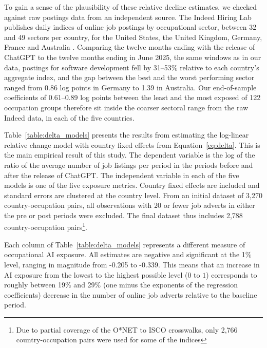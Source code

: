 \documentclass[11pt]{article}
\begin{document}
To gain a sense of the plausibility of these relative decline estimates, we checked against raw postings data from an independent source. The Indeed Hiring Lab publishes daily indices of online job postings by occupational sector, between 32 and 49 sectors per country, for the United States, the United Kingdom, Germany, France and Australia \citep{indeed_hiring_lab}. Comparing the twelve months ending with the release of ChatGPT to the twelve months ending in June 2025, the same windows as in our data, postings for software development fell by 31--53\% relative to each country's aggregate index, and the gap between the best and the worst performing sector ranged from 0.86 log points in Germany to 1.39 in Australia. Our end-of-sample coefficients of 0.61--0.89 log points between the least and the most exposed of 122 occupation groups therefore sit inside the coarser sectoral range from the raw Indeed data, in each of the five countries.

Table~\ref{table:delta_models} presents the results from estimating the log-linear relative change model with country fixed effects from Equation~\ref{eq:delta}. This is the main empirical result of this study. The dependent variable is the log of the ratio of the average number of job listings per period in the periods before and after the release of ChatGPT. The independent variable in each of the five models is one of the five exposure metrics. Country fixed effects are included and standard errors are clustered at the country level. From an initial dataset of 3,270 country-occupation pairs, all observations with 20 or fewer job adverts in either the pre or post periods were excluded. The final dataset thus includes 2,788 country-occupation pairs\footnote{Due to partial coverage of the O*NET to ISCO crosswalks, only 2,766 country-occupation pairs were used for some of the indices}.

Each column of Table~\ref{table:delta_models} represents a different measure of occupational AI exposure. All estimates are negative and significant at the 1\% level, ranging in magnitude from -0.205 to -0.339. This means that an increase in AI exposure from the lowest to the highest possible level ($0$ to $1$) corresponds to roughly between 19\% and 29\% (one minus the exponents of the regression coefficients) decrease in the number of online job adverts relative to the baseline period.
\end{document}

